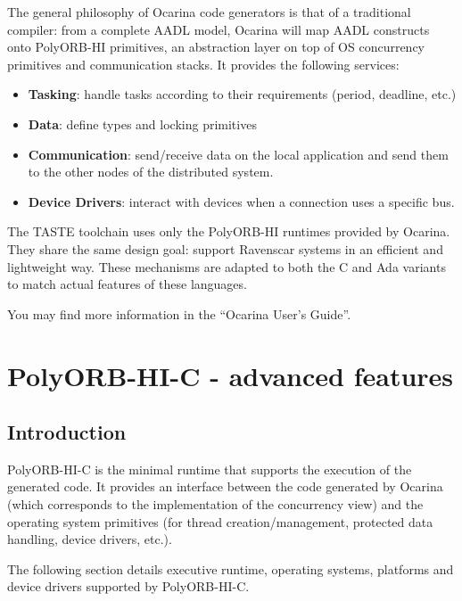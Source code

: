 \documentclass[11pt]{book}
\newcommand{\Concept}[1]{#1\xspace}
\newcommand{\taste}{\Concept{TASTE}}
\begin{document}
The general philosophy of Ocarina code generators is that of a
traditional compiler: from a complete AADL model, Ocarina will map
AADL constructs onto PolyORB-HI primitives, an abstraction layer on
top of OS concurrency primitives and communication stacks.
It provides the following services:

\begin{itemize}
\item
  \textbf{Tasking}: handle tasks according to their requirements (period,
  deadline, etc.)
\item
  \textbf{Data}: define types and locking primitives
\item
  \textbf{Communication}: send/receive data on the local application and
  send them to the other nodes of the distributed system.
\item
  \textbf{Device Drivers}: interact with devices when a connection uses a
  specific bus.
\end{itemize}

The \taste toolchain uses only the PolyORB-HI runtimes provided by
Ocarina. They share the same design goal: support Ravenscar systems
in an efficient and lightweight way. These mechanisms are adapted to
both the C and Ada variants to match actual features of these
languages.

You may find more information in the ``Ocarina User's Guide''.

\section{PolyORB-HI-C - advanced features}
   \subsection{Introduction}
   PolyORB-HI-C is the minimal runtime that supports the execution of the
   generated code. It provides an interface between the code  generated by
   Ocarina (which corresponds to the implementation of the concurrency view) and
   the operating system primitives (for thread creation/management, protected
   data handling, device drivers, etc.).

   The following section details executive runtime, operating systems,
   platforms and device
   drivers supported by PolyORB-HI-C.
\end{document}
